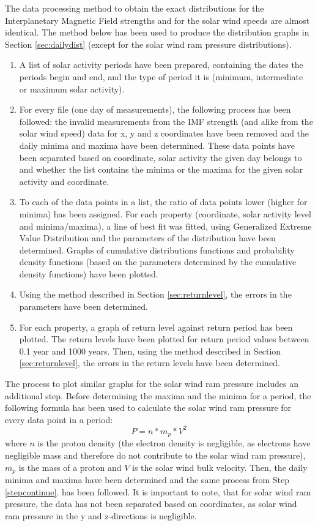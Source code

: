 \documentclass[12pt]{article}
\begin{document}
        The data processing method to obtain the exact distributions for the Interplanetary Magnetic Field strengths and for the solar wind speeds are almost identical. The method below has been used to produce the distribution graphs in Section \ref{sec:dailydist} (except for the solar wind ram pressure distributions).
        \begin{enumerate}
            \item A list of solar activity periods have been prepared, containing the dates the periods begin and end, and the type of period it is (minimum, intermediate or maximum solar activity).
            \item For every file (one day of measurements), the following process has been followed: the invalid measurements from the IMF strength (and alike from the solar wind speed) data for x, y and z coordinates have been removed and the daily minima and maxima have been determined. These data points have been separated based on coordinate, solar activity the given day belongs to and whether the list contains the minima or the maxima for the given solar activity and coordinate.\label{stepcontinue}
            \item To each of the data points in a list, the ratio of data points lower (higher for minima) has been assigned. For each property (coordinate, solar activity level and minima/maxima), a line of best fit was fitted, using Generalized Extreme Value Distribution and the parameters of the distribution have been determined. Graphs of cumulative distributions functions and probability density functions (based on the parameters determined by the cumulative density functions) have been plotted.
            \item Using the method described in Section \ref{sec:returnlevel}, the errors in the parameters have been determined.
            \item For each property, a graph of return level against return period has been plotted. The return levels have been plotted for return period values between 0.1 year and 1000 years. Then, using the method described in Section \ref{sec:returnlevel}, the errors in the return levels have been determined.
        \end{enumerate}
        The process to plot similar graphs for the solar wind ram pressure includes an additional step. Before determining the maxima and the minima for a period, the following formula has been used to calculate the solar wind ram pressure for every data point in a period:
        \begin{equation}
            P=n*m_p*V^2
        \end{equation}
        where $n$ is the proton density (the electron density is negligible, as electrons have negligible mass and therefore do not contribute to the solar wind ram pressure), $m_p$ is the mass of a proton and $V$ is the solar wind bulk velocity. Then, the daily minima and maxima have been determined and the same process from Step \ref{stepcontinue}. has been followed. It is important to note, that for solar wind ram pressure, the data has not been separated based on coordinates, as solar wind ram pressure in the y and z-directions is negligible.
\end{document}
